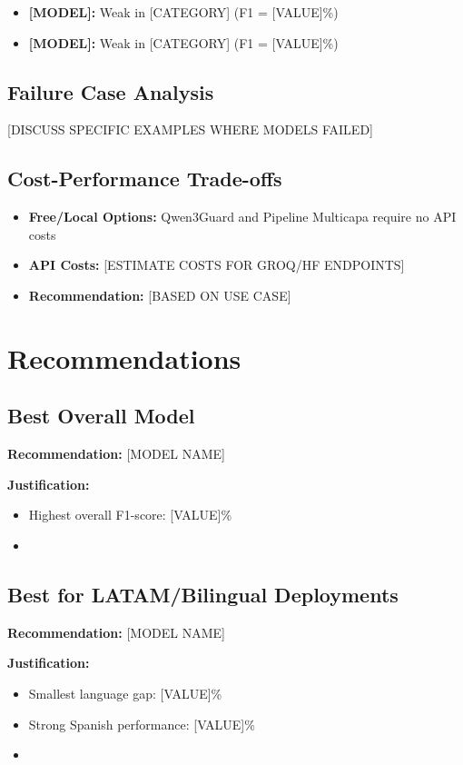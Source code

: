 \documentclass[11pt,a4paper]{article}
\begin{document}
\begin{itemize}
    \item \textbf{[MODEL]:} Weak in [CATEGORY] (F1 = [VALUE]\%)
    \item \textbf{[MODEL]:} Weak in [CATEGORY] (F1 = [VALUE]\%)
\end{itemize}

\subsection{Failure Case Analysis}
[DISCUSS SPECIFIC EXAMPLES WHERE MODELS FAILED]

\subsection{Cost-Performance Trade-offs}
\begin{itemize}
    \item \textbf{Free/Local Options:} Qwen3Guard and Pipeline Multicapa require no API costs
    \item \textbf{API Costs:} [ESTIMATE COSTS FOR GROQ/HF ENDPOINTS]
    \item \textbf{Recommendation:} [BASED ON USE CASE]
\end{itemize}

\section{Recommendations}

\subsection{Best Overall Model}
\textbf{Recommendation:} [MODEL NAME]

\textbf{Justification:}
\begin{itemize}
    \item Highest overall F1-score: [VALUE]\%
    \item [OTHER REASONS]
\end{itemize}

\subsection{Best for LATAM/Bilingual Deployments}
\textbf{Recommendation:} [MODEL NAME]

\textbf{Justification:}
\begin{itemize}
    \item Smallest language gap: [VALUE]\%
    \item Strong Spanish performance: [VALUE]\%
    \item [OTHER REASONS]
\end{itemize}
\end{document}

